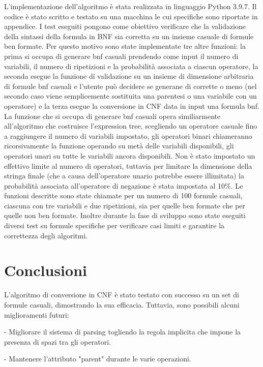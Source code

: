 \documentclass{article} %
\begin{document}
L'implementazione dell'algoritmo è stata realizzata in linguaggio Python 3.9.7. Il codice è stato scritto e testato su una macchina le cui specifiche sono riportate in appendice.
I test eseguiti pongono come obiettivo verificare che la validazione della sintassi della formula in BNF sia corretta su un insieme casuale di formule ben formate. Per questo motivo sono state implementate tre altre funzioni: la prima si occupa di generare bnf casuali prendendo come input il numero di variabili, il numero di ripetizioni e la probabilità associata a ciascun operatore, la seconda esegue la funzione di validazione su un insieme di dimensione arbitraria di formule bnf casuali e l'utente può decidere se generane di corrette o meno (nel secondo caso viene semplicemente sostituita una parentesi o una variabile con un operatore) e la terza esegue la conversione in CNF data in input una formula bnf.
La funzione che si occupa di generare bnf casuali opera similiarmente all'algoritmo che costruisce l'expression tree, scegliendo un operatore casuale fino a raggiungere il numero di variabili impostato, gli operatori binari chiameranno ricorsivamente la funzione operando su metà delle variabili disponibili, gli operatori unari su tutte le variabili ancora disponibili. Non è stato impostato un effettivo limite al numero di operatori, tuttavia per limitare la dimensione della stringa finale (che a causa dell'operatore unario potrebbe essere illimitata) la probabilità associata all'operatore di negazione è stata impostata al 10\%.
Le funzioni descritte sono state chiamate per un numero di 100 formule casuali, ciascuna con tre variabili e due ripetizioni, sia per quelle ben formate che per quelle non ben formate. Inoltre durante la fase di sviluppo sono state eseguiti diversi test su formule specifiche per verificare casi limiti e garantire la correttezza degli algoritmi.

\section*{Conclusioni}  

L'algoritmo di conversione in CNF è stato testato con successo su un set di formule casuali, dimostrando la sua efficacia. Tuttavia, sono possibili alcuni miglioramenti futuri:

- Migliorare il sistema di parsing togliendo la regola implicita che impone la presenza di spazi tra gli operatori.

- Mantenere l'attributo "parent" durante le varie operazioni.
\end{document}
